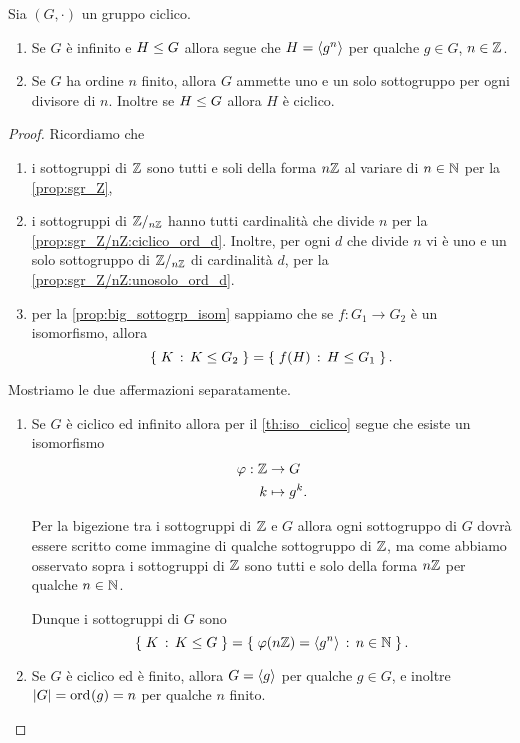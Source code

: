 \begin{corollary}
     \label{cor:sgr_gruppo_ciclico}
    Sia $(G, \cdot)$ un gruppo ciclico.
    \begin{enumerate}[label={(\roman*)}]
        \item Se $G$ è infinito e $H \sgr G$ allora segue che $H = \gen*{g^n}$ per qualche $g \in G$, $n \in \Z$.
        \item Se $G$ ha ordine $n$ finito, allora $G$ ammette uno e un solo sottogruppo per ogni divisore di $n$.
        Inoltre se $H \sgr G$ allora $H$ è ciclico.
    \end{enumerate}
\end{corollary}
\begin{proof}
    Ricordiamo che \begin{enumerate}
        \item i sottogruppi di $\Z$ sono tutti e soli della forma $n\Z$ al variare di $n \in \N$ per la \autoref{prop:sgr_Z},
        \item i sottogruppi di $\Zmod{n}$ hanno tutti cardinalità che divide $n$ per la \autoref{prop:sgr_Z/nZ:ciclico_ord_d}. Inoltre, per ogni $d$ che divide $n$ vi è uno e un solo sottogruppo di $\Zmod{n}$ di cardinalità $d$, per la \autoref{prop:sgr_Z/nZ:unosolo_ord_d}.
        \item per la \autoref{prop:big_sottogrp_isom} sappiamo che se $f : G_1 \to G_2$ è un isomorfismo, allora \[
            \set{K \suchthat K \sgr G_2} = \set{f(H) \suchthat H \sgr G_1}. 
        \]
    \end{enumerate}

    Mostriamo le due affermazioni separatamente.
    \begin{enumerate}[label={(\roman*)}]
        \item Se $G$ è ciclico ed infinito allora per il \autoref{th:iso_ciclico} segue che esiste un isomorfismo \begin{align*}
            \phi : \Z &\to G \\
            k &\mapsto g^k.
        \end{align*}

        Per la bigezione tra i sottogruppi di $\Z$ e $G$ allora ogni sottogruppo di $G$ dovrà essere scritto come immagine di qualche sottogruppo di $\Z$, ma come abbiamo osservato sopra i sottogruppi di $\Z$ sono tutti e solo della forma $n\Z$ per qualche $n \in \N$.
        
        Dunque i sottogruppi di $G$ sono \[
            \set{K \suchthat K \sgr G} = \set{\phi(n\Z) = \gen*{g^n} \suchthat n \in \N}.    
        \]
        \item Se $G$ è ciclico ed è finito, allora $G = \gen*{g}$ per qualche $g \in G$, e inoltre $\abs*{G} = \ord{g} = n$ per qualche $n$ finito.
        

\end{enumerate}
\end{proof}
